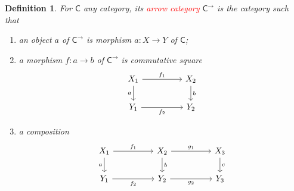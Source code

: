 \documentclass{article}
\newtheorem{definition}[theorem]{Definition}
\newcommand*{\cat}[1]{\textsf{#1}\xspace}
\newcommand{\redt}[1]{\textcolor{red}{#1}}
\begin{document}
\begin{definition}
\rm For $\cat{C}$ any category, its \redt{arrow category} $\cat{C}^\to$ is the category such that 
\begin{enumerate}
	\item an object $a$ of $\cat{C}^\to$ is morphism $a: X\to Y$ of $\cat{C}$;
	\item a morphism $f: a \to b$ of $\cat{C}^\to$ is commutative square
	$$
\begin{tikzcd}
X_1 \arrow[d, "a"'] \arrow[rr, "f_1"] &  & X_2 \arrow[d, "b	"] \\
Y_1 \arrow[rr, "f_2"']                  &  & Y_2                 
\end{tikzcd}
	$$
	\item a composition
	$$
\begin{tikzcd}
X_1 \arrow[d, "a"'] \arrow[rr, "f_1"] &  & X_2 \arrow[d, "b"] \arrow[rr, "g_1"] &  & X_3 \arrow[d, "c"] \\
Y_1 \arrow[rr, "f_2"']                &  & Y_2 \arrow[rr, "g_2"']               &  & Y_3               
\end{tikzcd}
	$$
\end{enumerate}
\end{definition}
\end{document}
